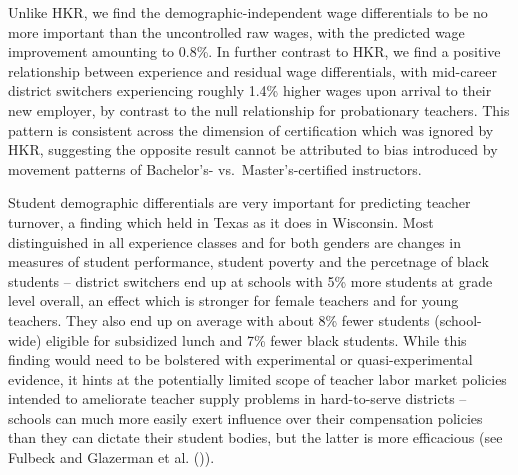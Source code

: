 Unlike HKR, we find the demographic-independent wage differentials to be
no more important than the uncontrolled raw wages, with the predicted
wage improvement amounting to 0.8\%. In further contrast to HKR, we find
a positive relationship between experience and residual wage
differentials, with mid-career district switchers experiencing roughly
1.4\% higher wages upon arrival to their new employer, by contrast to
the null relationship for probationary teachers. This pattern is
consistent across the dimension of certification which was ignored by
HKR, suggesting the opposite result cannot be attributed to bias
introduced by movement patterns of Bachelor's- vs.~Master's-certified
instructors.

Student demographic differentials are very important for predicting
teacher turnover, a finding which held in Texas as it does in Wisconsin.
Most distinguished in all experience classes and for both genders are
changes in measures of student performance, student poverty and the
percetnage of black students -- district switchers end up at schools
with 5\% more students at grade level overall, an effect which is
stronger for female teachers and for young teachers. They also end up on
average with about 8\% fewer students (school-wide) eligible for
subsidized lunch and 7\% fewer black students. While this finding would
need to be bolstered with experimental or quasi-experimental evidence,
it hints at the potentially limited scope of teacher labor market
policies intended to ameliorate teacher supply problems in hard-to-serve
districts -- schools can much more easily exert influence over their
compensation policies than they can dictate their student bodies, but
the latter is more efficacious (see Fulbeck
\citeyear{fulbeck} and Glazerman et al.
(\citeyear{glazerman})).


